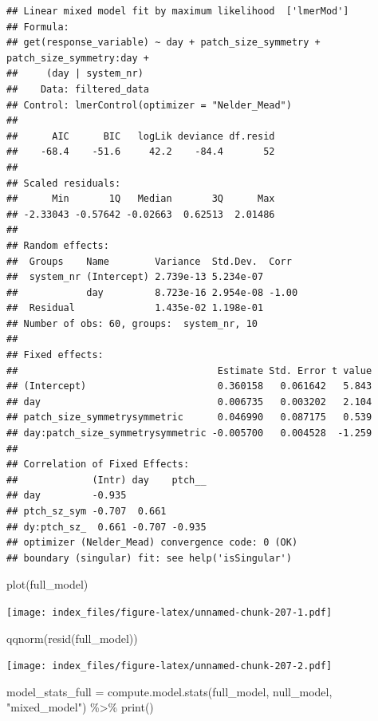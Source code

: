 \documentclass[
]{article}
\newenvironment{Shaded}{\begin{snugshade}}{\end{snugshade}}
\newcommand{\FunctionTok}[1]{\textcolor[rgb]{0.00,0.00,0.00}{#1}}
\newcommand{\NormalTok}[1]{#1}
\newcommand{\OtherTok}[1]{\textcolor[rgb]{0.56,0.35,0.01}{#1}}
\newcommand{\SpecialCharTok}[1]{\textcolor[rgb]{0.00,0.00,0.00}{#1}}
\newcommand{\StringTok}[1]{\textcolor[rgb]{0.31,0.60,0.02}{#1}}
\begin{document}
\begin{verbatim}
## Linear mixed model fit by maximum likelihood  ['lmerMod']
## Formula: 
## get(response_variable) ~ day + patch_size_symmetry + patch_size_symmetry:day +  
##     (day | system_nr)
##    Data: filtered_data
## Control: lmerControl(optimizer = "Nelder_Mead")
## 
##      AIC      BIC   logLik deviance df.resid 
##    -68.4    -51.6     42.2    -84.4       52 
## 
## Scaled residuals: 
##      Min       1Q   Median       3Q      Max 
## -2.33043 -0.57642 -0.02663  0.62513  2.01486 
## 
## Random effects:
##  Groups    Name        Variance  Std.Dev.  Corr 
##  system_nr (Intercept) 2.739e-13 5.234e-07      
##            day         8.723e-16 2.954e-08 -1.00
##  Residual              1.435e-02 1.198e-01      
## Number of obs: 60, groups:  system_nr, 10
## 
## Fixed effects:
##                                   Estimate Std. Error t value
## (Intercept)                       0.360158   0.061642   5.843
## day                               0.006735   0.003202   2.104
## patch_size_symmetrysymmetric      0.046990   0.087175   0.539
## day:patch_size_symmetrysymmetric -0.005700   0.004528  -1.259
## 
## Correlation of Fixed Effects:
##             (Intr) day    ptch__
## day         -0.935              
## ptch_sz_sym -0.707  0.661       
## dy:ptch_sz_  0.661 -0.707 -0.935
## optimizer (Nelder_Mead) convergence code: 0 (OK)
## boundary (singular) fit: see help('isSingular')
\end{verbatim}

\begin{Shaded}
\begin{Highlighting}[]
\FunctionTok{plot}\NormalTok{(full\_model)}
\end{Highlighting}
\end{Shaded}

\texttt{[image: index\_files/figure-latex/unnamed-chunk-207-1.pdf]}

\begin{Shaded}
\begin{Highlighting}[]
\FunctionTok{qqnorm}\NormalTok{(}\FunctionTok{resid}\NormalTok{(full\_model))}
\end{Highlighting}
\end{Shaded}

\texttt{[image: index\_files/figure-latex/unnamed-chunk-207-2.pdf]}

\begin{Shaded}
\begin{Highlighting}[]
\NormalTok{model\_stats\_full }\OtherTok{=} \FunctionTok{compute.model.stats}\NormalTok{(full\_model,}
\NormalTok{                                       null\_model,}
                                       \StringTok{"mixed\_model"}\NormalTok{) }\SpecialCharTok{\%\textgreater{}\%}
  \FunctionTok{print}\NormalTok{()}
\end{Highlighting}
\end{Shaded}
\end{document}
